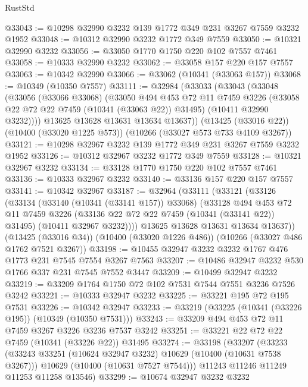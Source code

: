 \begin{lexlean}{RustStd}
\begin{coremodule}
@33043 := @10298 @32990 @3232 @139 @1772 @349 @231 @3267 @7559 @3232 @1952
@33048 := @10312 @32990 @3232 @1772 @349 @7559
@33050 := @10321 @32990 @3232
@33056 := @33050 @1770 @1750 @220 @102 @7557 @7461
@33058 := @10333 @32990 @3232
@33062 := @33058 @157 @220 @157 @7557
@33063 := @10342 @32990
@33066 := @33062 (@10341 (@33063 @157))
@33068 := @10349 (@10350 @7557)
@33111 := @32984
    (@33033
      (@33043
        (@33048
          (@33056
            (@33066 @33068)
            (@33050
              @494
              @453
              @72
              @11
              @7459
              @3226
              (@33058 @22 @72 @22 @7459 (@10341 (@33063 @22)) @31495)
              (@10411 @32990 @3232))))
        @13625
        @13628
        @13631
        @13634
        @13637))
    (@13425 (@33016 @22))
    (@10400 (@33020 @1225 @573))
    (@10266 (@33027 @573 @733 @4109 @3267))
@33121 := @10298 @32967 @3232 @139 @1772 @349 @231 @3267 @7559 @3232 @1952
@33126 := @10312 @32967 @3232 @1772 @349 @7559
@33128 := @10321 @32967 @3232
@33134 := @33128 @1770 @1750 @220 @102 @7557 @7461
@33136 := @10333 @32967 @3232
@33140 := @33136 @157 @220 @157 @7557
@33141 := @10342 @32967
@33187 := @32964
    (@33111
      (@33121
        (@33126
          (@33134
            (@33140 (@10341 (@33141 @157)) @33068)
            (@33128
              @494
              @453
              @72
              @11
              @7459
              @3226
              (@33136 @22 @72 @22 @7459 (@10341 (@33141 @22)) @31495)
              (@10411 @32967 @3232))))
        @13625
        @13628
        @13631
        @13634
        @13637))
    (@13425 (@33016 @34))
    (@10400 (@33020 @1226 @486))
    (@10266 (@33027 @486 @1762 @7521 @3267))
@33198 := @10455 @32947 @3232 @3232 @1767 @476 @1773 @231 @7545 @7554 @3267 @7563
@33207 := @10486 @32947 @3232 @530 @1766 @337 @231 @7545 @7552 @3447
@33209 := @10499 @32947 @3232
@33219 := @33209 @1764 @1750 @72 @102 @7531 @7544 @7551 @3236 @7526 @3242
@33221 := @10333 @32947 @3232
@33225 := @33221 @195 @72 @195 @7531
@33226 := @10342 @32947
@33233 := @33219 (@33225 (@10341 (@33226 @195)) (@10349 (@10350 @7531)))
@33243 := @33209 @494 @453 @72 @11 @7459 @3267 @3226 @3236 @7537 @3242
@33251 := @33221 @22 @72 @22 @7459 (@10341 (@33226 @22)) @31495
@33274 := @33198
    (@33207
      (@33233
        (@33243 @33251 (@10624 @32947 @3232) @10629 (@10400 (@10631 @7538 @3267)))
        @10629
        (@10400 (@10631 @7527 @7544)))
      @11243
      @11246
      @11249
      @11253
      @11258
      @13546)
@33299 := @10674
    @32947
    @3232
    @3232

\end{coremodule}
\end{lexlean}
